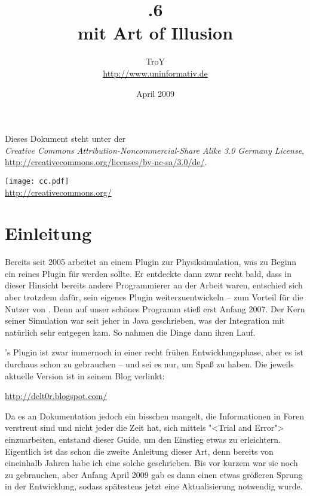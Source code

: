 \documentclass[12pt,a4paper]{scrartcl}
\begin{document}
\author{TroY \\ \url{http://www.uninformativ.de}}
\title{.6 \\ mit Art of Illusion}
\date{April 2009}
\maketitle
\thispagestyle{empty}

\vspace{100mm}

\begin{center}
	Dieses Dokument steht unter der \\
	\textit{Creative Commons Attribution-Noncommercial-Share Alike 3.0 Germany License}, \\
	\url{http://creativecommons.org/licenses/by-nc-sa/3.0/de/}.

	\texttt{[image: cc.pdf]} \\
	\url{http://creativecommons.org/}
\end{center}

\pagebreak


\tableofcontents
\thispagestyle{empty}
\pagebreak



\section{Einleitung}
Bereits seit 2005 arbeitet \deltor an einem Plugin zur Physiksimulation,
was zu Beginn ein reines Plugin für \blender werden sollte. Er entdeckte
dann zwar recht bald, dass in dieser Hinsicht bereits andere
Programmierer an der Arbeit waren, entschied sich aber trotzdem dafür,
sein eigenes Plugin weiterzuentwickeln -- zum Vorteil für die Nutzer von
\aoi. Denn auf unser schönes Programm stieß \deltor erst Anfang 2007.
Der Kern seiner Simulation war seit jeher in Java geschrieben, was der
Integration mit \aoi natürlich sehr entgegen kam. So nahmen die Dinge
dann ihren Lauf.

\deltor's Plugin ist zwar immernoch in einer recht frühen
Entwicklungsphase, aber es ist durchaus schon zu gebrauchen -- und sei
es nur, um Spaß zu haben. Die jeweils aktuelle Version ist in seinem
Blog verlinkt:

\url{http://delt0r.blogspot.com/}

Da es an Dokumentation jedoch ein bisschen mangelt, die Informationen in
Foren verstreut sind und nicht jeder die Zeit hat, sich mittels "<Trial
and Error"> einzuarbeiten, entstand dieser Guide, um den Einstieg etwas
zu erleichtern. Eigentlich ist das schon die zweite Anleitung dieser
Art, denn bereits von eineinhalb Jahren habe ich eine solche
geschrieben. Bis vor kurzem war sie noch zu gebrauchen, aber Anfang
April 2009 gab es dann einen etwas größeren Sprung in der Entwicklung,
sodass spätestens jetzt eine Aktualisierung notwendig wurde.
\end{document}
